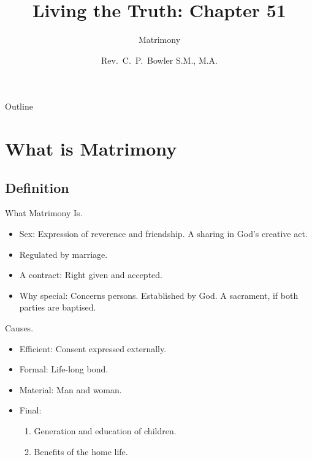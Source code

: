 \documentclass{beamer}
\title[Living the Truth 51] %
{Living the Truth: Chapter 51}
\subtitle
{Matrimony} %
\author{Rev.~C.~P.~Bowler S.M., M.A.}
\begin{document}
\begin{frame}
  \titlepage
\end{frame}

\begin{frame}{Outline}
  \tableofcontents
\end{frame}




\section{What is Matrimony}

\subsection{Definition}

\begin{frame}{What Matrimony Is.}
\begin{itemize}
 \item   Sex:     Expression of reverence and friendship.
         A sharing in God's creative act.
 \item   Regulated by marriage.
 \item   A contract:   Right given and accepted.
 \item    Why special:      Concerns persons. Established by God.
                  A sacrament, if both parties are baptised.
\end{itemize}
\end{frame}

\begin{frame}{Causes.}
\begin{itemize}
 \item   Efficient: Consent expressed externally.
 \item   Formal: Life-long bond.
 \item   Material: Man and woman.
 \item   Final:   
\begin{enumerate}
\item Generation and education of children.
\item     Benefits of the home life.
\end{enumerate}
\end{itemize}
\end{frame}
\end{document}
